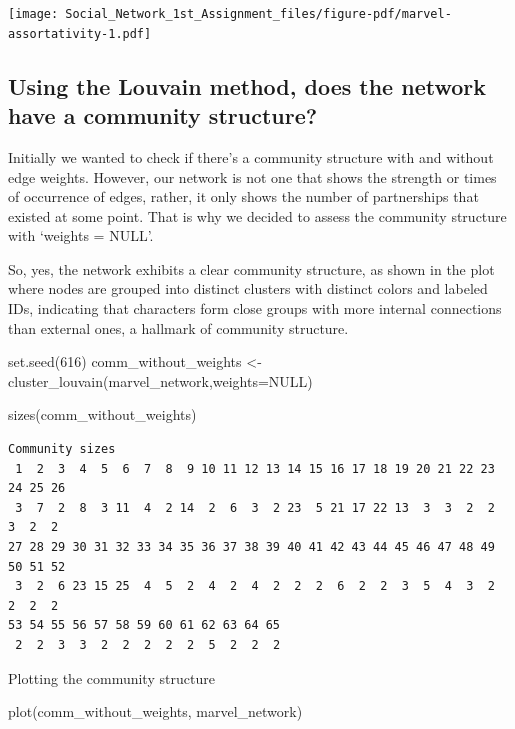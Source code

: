 \documentclass[
  letterpaper,
  DIV=11,
  numbers=noendperiod]{scrartcl}
\newenvironment{Shaded}{\begin{snugshade}}{\end{snugshade}}
\newcommand{\AttributeTok}[1]{\textcolor[rgb]{0.40,0.45,0.13}{#1}}
\newcommand{\ConstantTok}[1]{\textcolor[rgb]{0.56,0.35,0.01}{#1}}
\newcommand{\DecValTok}[1]{\textcolor[rgb]{0.68,0.00,0.00}{#1}}
\newcommand{\FunctionTok}[1]{\textcolor[rgb]{0.28,0.35,0.67}{#1}}
\newcommand{\NormalTok}[1]{\textcolor[rgb]{0.00,0.23,0.31}{#1}}
\newcommand{\OtherTok}[1]{\textcolor[rgb]{0.00,0.23,0.31}{#1}}
\begin{document}
\texttt{[image: Social\_Network\_1st\_Assignment\_files/figure-pdf/marvel-assortativity-1.pdf]}

\subsection{Using the Louvain method, does the network have a community
structure?}\label{using-the-louvain-method-does-the-network-have-a-community-structure}

Initially we wanted to check if there's a community structure with and
without edge weights. However, our network is not one that shows the
strength or times of occurrence of edges, rather, it only shows the
number of partnerships that existed at some point. That is why we
decided to assess the community structure with `weights = NULL'.

So, yes, the network exhibits a clear community structure, as shown in
the plot where nodes are grouped into distinct clusters with distinct
colors and labeled IDs, indicating that characters form close groups
with more internal connections than external ones, a hallmark of
community structure.

\begin{Shaded}
\begin{Highlighting}[]
\FunctionTok{set.seed}\NormalTok{(}\DecValTok{616}\NormalTok{)}
\NormalTok{comm\_without\_weights }\OtherTok{\textless{}{-}} \FunctionTok{cluster\_louvain}\NormalTok{(marvel\_network,}\AttributeTok{weights=}\ConstantTok{NULL}\NormalTok{)}

\FunctionTok{sizes}\NormalTok{(comm\_without\_weights)}
\end{Highlighting}
\end{Shaded}

\begin{verbatim}
Community sizes
 1  2  3  4  5  6  7  8  9 10 11 12 13 14 15 16 17 18 19 20 21 22 23 24 25 26 
 3  7  2  8  3 11  4  2 14  2  6  3  2 23  5 21 17 22 13  3  3  2  2  3  2  2 
27 28 29 30 31 32 33 34 35 36 37 38 39 40 41 42 43 44 45 46 47 48 49 50 51 52 
 3  2  6 23 15 25  4  5  2  4  2  4  2  2  2  6  2  2  3  5  4  3  2  2  2  2 
53 54 55 56 57 58 59 60 61 62 63 64 65 
 2  2  3  3  2  2  2  2  2  5  2  2  2 
\end{verbatim}

Plotting the community structure

\begin{Shaded}
\begin{Highlighting}[]
\FunctionTok{plot}\NormalTok{(comm\_without\_weights, marvel\_network)}
\end{Highlighting}
\end{Shaded}
\end{document}
